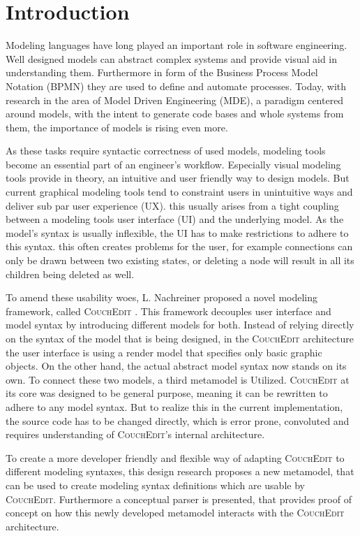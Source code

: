 \chapter{Introduction}
\label{ch:introduction}


Modeling languages have long played an important role in software engineering. Well designed models can abstract complex systems and provide visual aid in understanding them. Furthermore in form of the Business Process Model Notation (BPMN) they are used to define and automate processes. Today, with research in the area of Model Driven Engineering (MDE), a paradigm centered around models, with the intent to generate code bases and whole systems from them, the importance of models is rising even more.

As these tasks require syntactic correctness of used models, modeling tools become an essential part of an engineer's workflow. Especially visual modeling tools provide in theory, an intuitive and user friendly way to design models. But current graphical modeling tools tend to constraint users in unintuitive ways and deliver sub par user experience (UX). this usually arises from a tight coupling between a modeling tools user interface (UI) and the underlying model. As the model's syntax is usually inflexible, the UI has to make restrictions to adhere to this syntax. this often creates problems for the user, for example connections can only be drawn between two existing states, or deleting a node will result in all its children being deleted as well.

To amend these usability woes, L. Nachreiner proposed a novel modeling framework, called \textsc{CouchEdit} \cite{nachreiner_couchedit_2020}. This framework decouples user interface and model syntax by introducing different models for both. Instead of relying directly on the syntax of the model that is being designed, in the \textsc{CouchEdit} architecture the user interface is using a render model that specifies only basic graphic objects. On the other hand, the actual abstract model syntax now stands on its own. To connect these two models, a third metamodel is Utilized. \textsc{CouchEdit} at its core was designed to be general purpose, meaning it can be rewritten to adhere to any model syntax. But to realize this in the current implementation, the source code has to be changed directly, which is error prone, convoluted and requires understanding of \textsc{CouchEdit}'s internal architecture.

To create a more developer friendly and flexible way of adapting \textsc{CouchEdit} to different modeling syntaxes, this design research proposes a new metamodel, that can be used to create modeling syntax definitions which are usable by \textsc{CouchEdit}. Furthermore a conceptual parser is presented, that provides proof of concept on how this newly developed metamodel interacts with the \textsc{CouchEdit} architecture.

